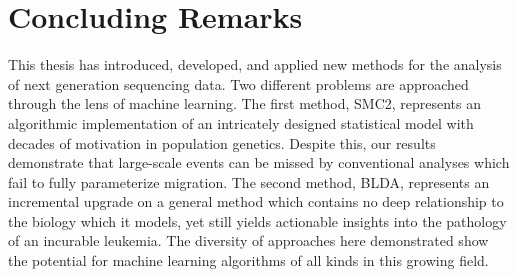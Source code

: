 \section{Concluding Remarks}

This thesis has introduced, developed, and applied new methods for the analysis of next generation sequencing data. Two different problems are approached through the lens of machine learning. The first method, SMC2, represents an algorithmic implementation of an intricately designed statistical model with decades of motivation in population genetics. Despite this, our results demonstrate that large-scale events can be missed by conventional analyses which fail to fully parameterize migration. The second method, BLDA, represents an incremental upgrade on a general method which contains no deep relationship to the biology which it models, yet still yields actionable insights into the pathology of an incurable leukemia. The diversity of approaches here demonstrated show the potential for machine learning algorithms of all kinds in this growing field.  
















